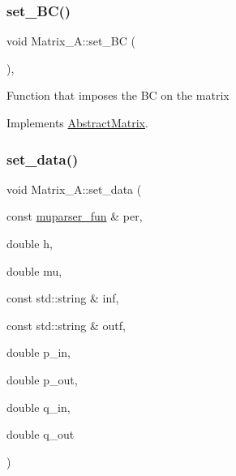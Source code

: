 \subsubsection{\texorpdfstring{set\+\_\+\+B\+C()}{set\_BC()}}
{\footnotesize\ttfamily void Matrix\+\_\+\+A\+::set\+\_\+\+BC (\begin{DoxyParamCaption}{ }\end{DoxyParamCaption})\hspace{0.3cm}{\ttfamily [override]}, {\ttfamily [virtual]}}

Function that imposes the BC on the matrix 

Implements \hyperlink{classAbstractMatrix_aa0a17dacbeede4180531b115d4a9f3eb}{Abstract\+Matrix}.

\mbox{\label{classMatrix__A_ad0a77ac1c6296a43f0ff240fe4c8af14}} 
\subsubsection{\texorpdfstring{set\+\_\+data()}{set\_data()}}
{\footnotesize\ttfamily void Matrix\+\_\+\+A\+::set\+\_\+data (\begin{DoxyParamCaption}\item[{const \hyperlink{classmuparser__fun}{muparser\+\_\+fun} \&}]{per,  }\item[{double}]{h,  }\item[{double}]{mu,  }\item[{const std\+::string \&}]{inf,  }\item[{const std\+::string \&}]{outf,  }\item[{double}]{p\+\_\+in,  }\item[{double}]{p\+\_\+out,  }\item[{double}]{q\+\_\+in,  }\item[{double}]{q\+\_\+out }\end{DoxyParamCaption})}

